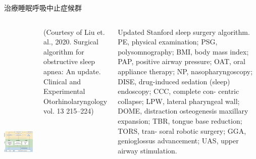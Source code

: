 \documentclass[aspectratio=169]{beamer}
\begin{document}
\begin{frame}{治療睡眠呼吸中止症候群}
\begin{columns}[onlytextwidth]


    \includegraphics[height = 12cm]{ceo-2020-01053f6.jpg}
    \par (Courtesy of Liu et. al., 2020. Surgical algorithm for obstructive sleep apnea: An update. Clinical and Experimental Otorhinolaryngology vol. 13 215–224)

    \par Updated Stanford sleep surgery algorithm. PE, physical examination; PSG, polysomnography; BMI, body mass index; PAP, positive airway pressure; OAT, oral appliance therapy; NP, nasopharyngoscopy; DISE, drug-induced sedation (sleep) endoscopy; CCC, complete con- centric collapse; LPW, lateral pharyngeal wall; DOME, distraction osteogenesis maxillary expansion; TBR, tongue base reduction; TORS, tran- soral robotic surgery; GGA, genioglossus advancement; UAS, upper airway stimulation.\\
\end{columns}


\end{frame}
\end{document}
